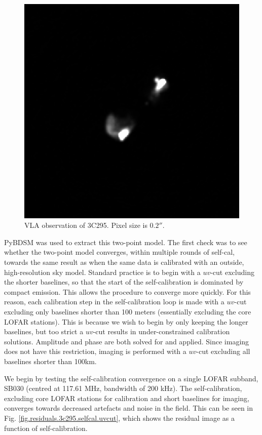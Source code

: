 \begin{figure}[h!]
\includegraphics[width=0.5\linewidth]{images/3c295-vla}
\caption{\label{fig.vla.3c295}VLA observation of 3C295. Pixel size is $0.2''$.}
\end{figure}

\pg
PyBDSM \citep{2015ascl.soft02007M} was used to extract this two-point model. The first check was to see whether the two-point model converges, within multiple rounds of self-cal, towards the same result as when the same data is calibrated with an outside, high-resolution sky model. Standard practice is to begin with a $uv$-cut excluding the shorter baselines, so that the start of the self-calibration is dominated by compact emission. This allows the procedure to converge more quickly. For this reason, each calibration step in the self-calibration loop is made with a $uv$-cut excluding only baselines shorter than 100 meters (essentially excluding the core LOFAR stations). This is because we wish to begin by only keeping the longer baselines, but too strict a $uv$-cut results in under-constrained calibration solutions. Amplitude and phase are both solved for and applied. Since imaging does not have this restriction, imaging is performed with a $uv$-cut excluding all baselines shorter than 100km. 

\pg
We begin by testing the self-calibration convergence on a single LOFAR subband, SB030 (centred at 117.61 MHz, bandwidth of 200 kHz). The self-calibration, excluding core LOFAR stations for calibration and short baselines for imaging, converges towards decreased artefacts and noise in the field. This can be seen in Fig. \ref{fig.residuals.3c295.selfcal.uvcut}, which shows the residual image as a function of self-calibration. 

